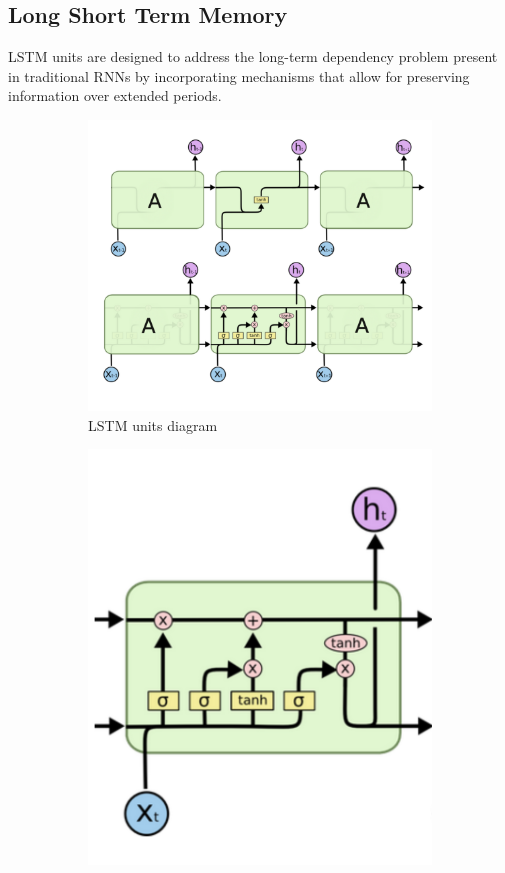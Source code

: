 \subsection{Long Short Term Memory}
LSTM units are designed to address the long-term dependency problem present in traditional RNNs by incorporating mechanisms that allow for preserving information over extended periods.
\begin{figure}[H]
    \centering
    \begin{subfigure}[b]{0.45\textwidth}
        \includegraphics[width=\linewidth]{img/LSTM.png}
        \caption{LSTM units diagram}
    \end{subfigure}
    \begin{subfigure}[b]{0.30\textwidth}
        \includegraphics[width=\linewidth]{img/LSTM_closeup.png}

\end{subfigure}
\end{figure}
